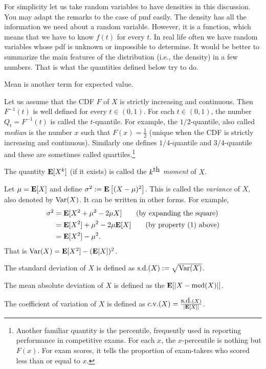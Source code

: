 \documentclass[preprint,  11pt]{amsart}
\def\half{\frac{1}{2}}
\def\sd{\mb{s.d.}}
\def\sig{{\sigma}}
\begin{document}
 For simplicity let us take random variables to have densities in this discussion. You may adapt the remarks to the case of pmf easily.  The density has all the information we need about a random variable. However, it is a function, which means that we have to know $f(t)$ for every $t$. In real life often we have random variables whose pdf is unknown or impossible to determine. It would be better to summarize the main features of the distribution (i.e., the density) in a few numbers. That is what the quantities defined below try to do.

 Mean is another term for expected value.

 Let us assume that the CDF $F$ of $X$ is strictly increasing and continuous. Then $F^{-1}(t)$ is well defined for every $t\in (0,1)$. For each $t\in (0,1)$, the number $Q_{t}=F^{-1}(t)$ is called the $t$-quantile. For example, the $1/2$-quantile, also called {\em median} is the number $x$ such that $F(x)=\half$ (unique when the CDF is strictly increasing and continuous). Similarly one defines $1/4$-quantile and $3/4$-quantile and these are sometimes called quartiles.\footnote{Another familiar quantity is the percentile, frequently used in reporting performance in competitive exams. For each $x$, the $x$-percentile is nothing but $F(x)$. For exam scores, it  tells the proportion of exam-takers who scored less than or equal to $x$.}

 The quantity $\mathbf{E}[X^{k}]$ (if it exists) is called the $k^{\mbox{th}}$ {\em moment} of $X$.

 Let $\mu=\mathbf{E}[X]$ and define $\sig^{2}:=\E\l[ (X-\mu)^{2}\r]$. This is called the {\em variance} of $X$, also denoted by $\mbox{Var}(X)$. It can be written in other forms. For example,
\begin{align*}
\sig^{2} &= \E[X^{2}+\mu^{2}-2\mu X] \qquad (\mb{by expanding the square})\\
 &= \E[X^{2}]+\mu^{2} - 2\mu \E[X] \qquad (\mb{by property (1) above})\\
 &= \E[X^{2}]-\mu^{2}.
\end{align*}
That is $\mbox{Var}(X)=\mathbf{E}[X^{2}]-(\mathbf{E}[X])^{2}$.

 The standard deviation of $X$ is defined as $\sd(X):=\sqrt{\Var(X)}$.

 The mean absolute deviation of $X$ is defined as the $\mathbf{E}[|X-\mbox{med}(X)|]$.

 The coefficient of variation of $X$ is defined as $\mb{c.v.}(X)=\frac{\sd(X)}{|{\bf E}[X]|}$.
\end{document}
